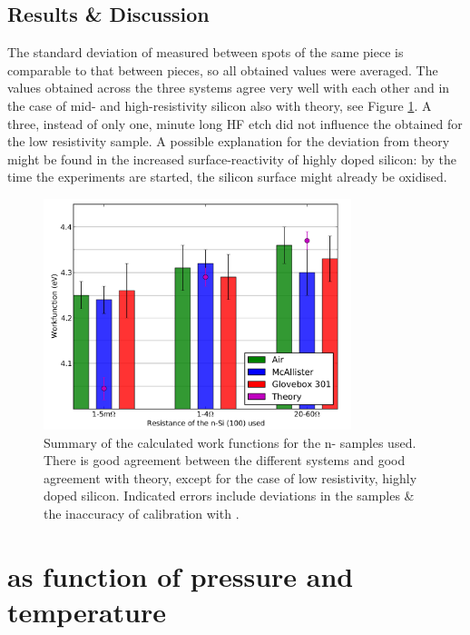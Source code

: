 \subsection{Results \& Discussion}
The standard deviation of measured \cpd{} between spots of the same piece is comparable to that between pieces, so all obtained values were averaged. The values obtained across the three systems agree very well with each other and in the case of mid- and high-resistivity silicon also with theory, see Figure \ref{fig:nsih}. A three,  instead of only one, minute long HF etch did not influence the \cpd{} obtained for the low resistivity sample. A possible explanation for the deviation from theory might be found in the increased surface-reactivity of highly doped silicon: by the time the experiments are started, the silicon surface might already be oxidised. 
\begin{figure}
\centering
	\includegraphics[width=0.8\textwidth]{./figs/chap2/Sih}
\caption{Summary of the calculated work functions for the n-\sih{} samples used. There is good agreement between the different systems and good agreement with theory, except for the case of low resistivity, highly doped silicon. Indicated errors include deviations in the samples \& the inaccuracy of calibration with \hopg{}.}
	\label{fig:nsih}
\end{figure}


\section{\cpd{} as function of pressure and temperature}
